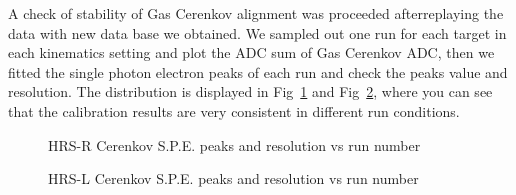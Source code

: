  A check of stability of Gas Cerenkov alignment was proceeded afterreplaying the data with new data base we obtained. We sampled out one run for each target in each kinematics setting and plot the ADC sum of Gas Cerenkov ADC, then we fitted the single photon electron peaks of each run and check the peaks value and resolution. The distribution is displayed in Fig~\ref{gcr_stability} and Fig~\ref{gcl_stability}, where you can see that the calibration results are very consistent in different run conditions.  

\begin{figure}[htb]
\centerline{}
\caption[HRS-R Cerenkov S.P.E. peaks and resolution vs run number]{\footnotesize{HRS-R Cerenkov S.P.E. peaks and resolution vs run number}
\label{gcr_stability}}
\end{figure}

\begin{figure}[htb]
\centerline{}
\caption[HRS-L Cerenkov S.P.E. peaks and resolution vs run number]{\footnotesize{HRS-L Cerenkov S.P.E. peaks and resolution vs run number}
\label{gcl_stability}}
\end{figure}



\clearpage

